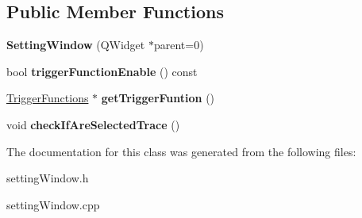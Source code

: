 \subsection*{Public Member Functions}
\begin{DoxyCompactItemize}
\item 
\mbox{\label{class_setting_window_ac8848b08b28320174d3057676b9f3bd9}} 
{\bfseries Setting\+Window} (Q\+Widget $\ast$parent=0)
\item 
\mbox{\label{class_setting_window_a4c72394df3b0d7a59035b1f6c2b5765d}} 
bool {\bfseries trigger\+Function\+Enable} () const
\item 
\mbox{\label{class_setting_window_a131160f6b1b9960cce9669070533db10}} 
\hyperlink{class_trigger_functions}{Trigger\+Functions} $\ast$ {\bfseries get\+Trigger\+Funtion} ()
\item 
\mbox{\label{class_setting_window_a43e7f408e29218f28fcbea1f039701a6}} 
void {\bfseries check\+If\+Are\+Selected\+Trace} ()
\end{DoxyCompactItemize}


The documentation for this class was generated from the following files\+:\begin{DoxyCompactItemize}
\item 
setting\+Window.\+h\item 
setting\+Window.\+cpp\end{DoxyCompactItemize}
